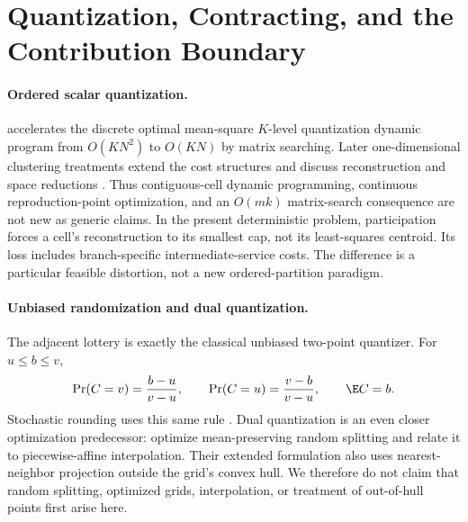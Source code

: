 \section{Quantization, Contracting, and the Contribution Boundary}\label{sec:r37-position}
\paragraph{Ordered scalar quantization.}
\citet{Wu1991} accelerates the discrete optimal mean-square $K$-level quantization dynamic program from $O(KN^2)$ to $O(KN)$ by matrix searching. Later one-dimensional clustering treatments extend the cost structures and discuss reconstruction and space reductions \citep{GronlundEtAl2017}. Thus contiguous-cell dynamic programming, continuous reproduction-point optimization, and an $O(mk)$ matrix-search consequence are not new as generic claims. In the present deterministic problem, participation forces a cell's reconstruction to its smallest cap, not its least-squares centroid. Its loss includes branch-specific intermediate-service costs. The difference is a particular feasible distortion, not a new ordered-partition paradigm.

\paragraph{Unbiased randomization and dual quantization.}
The adjacent lottery is exactly the classical unbiased two-point quantizer. For $u\leq b\leq v$,
\begin{equation}\label{eq:unbiased}
 \Pr(C=v)=\frac{b-u}{v-u},\qquad
 \Pr(C=u)=\frac{v-b}{v-u},\qquad \E C=b.
\end{equation}
Stochastic rounding uses this same rule \citep{CrociEtAl2022}. Dual quantization is an even closer optimization predecessor: \citet{PagesWilbertz2012} optimize mean-preserving random splitting and relate it to piecewise-affine interpolation. Their extended formulation also uses nearest-neighbor projection outside the grid's convex hull. We therefore do not claim that random splitting, optimized grids, interpolation, or treatment of out-of-hull points first arise here.

